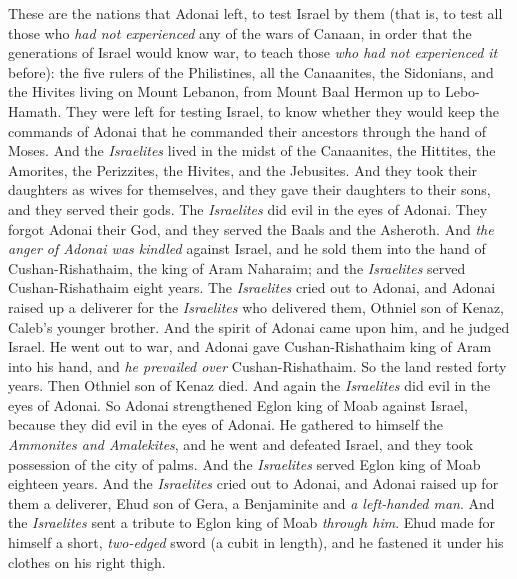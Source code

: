 \begin{biblechapter} %
 These are the nations that Adonai left, to test Israel by them (that is, to test all those who \textit{had not experienced} any of the wars of Canaan,
\verse in order that the generations of Israel would know war, to teach those \textit{who had not experienced it} before):
\verse the five rulers of the Philistines, all the Canaanites, the Sidonians, and the Hivites living on Mount Lebanon, from Mount Baal Hermon up to Lebo-Hamath.
\verse They were left for testing Israel, to know whether they would keep the commands of Adonai that he commanded their ancestors through the hand of Moses.
\verse And the \textit{Israelites} lived in the midst of the Canaanites, the Hittites, the Amorites, the Perizzites, the Hivites, and the Jebusites.
\verse And they took their daughters as wives for themselves, and they gave their daughters to their sons, and they served their gods.
 The \textit{Israelites} did evil in the eyes of Adonai. They forgot Adonai their God, and they served the Baals and the Asheroth.
\verse And \textit{the anger of Adonai was kindled} against Israel, and he sold them into the hand of Cushan-Rishathaim, the king of Aram Naharaim; and the \textit{Israelites} served Cushan-Rishathaim eight years.
\verse The \textit{Israelites} cried out to Adonai, and Adonai raised up a deliverer for the \textit{Israelites} who delivered them, Othniel son of Kenaz, Caleb’s younger brother.
\verse And the spirit of Adonai came upon him, and he judged Israel. He went out to war, and Adonai gave Cushan-Rishathaim king of Aram into his hand, and \textit{he prevailed over} Cushan-Rishathaim.
\verse So the land rested forty years. Then Othniel son of Kenaz died.
 And again the \textit{Israelites} did evil in the eyes of Adonai. So Adonai strengthened Eglon king of Moab against Israel, because they did evil in the eyes of Adonai.
\verse He gathered to himself the \textit{Ammonites and Amalekites}, and he went and defeated Israel, and they took possession of the city of palms.
\verse And the \textit{Israelites} served Eglon king of Moab eighteen years.
\verse And the \textit{Israelites} cried out to Adonai, and Adonai raised up for them a deliverer, Ehud son of Gera, a Benjaminite and \textit{a left-handed man}. And the \textit{Israelites} sent a tribute to Eglon king of Moab \textit{through him}.
\verse Ehud made for himself a short, \textit{two-edged} sword (a cubit in length), and he fastened it under his clothes on his right thigh.

\end{biblechapter}
